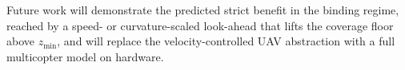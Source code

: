 \documentclass{ifacconf}
\begin{document}
Future work will demonstrate the predicted strict benefit in the binding regime, reached by a speed- or
curvature-scaled look-ahead that lifts the coverage floor above $z_{\min}$, and will replace the
velocity-controlled UAV abstraction with a full multicopter model on hardware.

\end{document}

